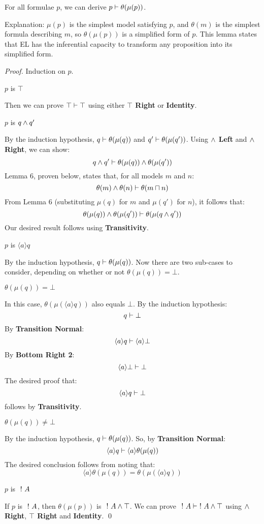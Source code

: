 \begin{lemma}
For all formulae $p$, we can derive $p \vdash \theta(\mu(p))$.
\end{lemma}
Explanation: $\mu(p)$ is the simplest model satisfying $p$, and $\theta(m)$ is the simplest formula describing $m$, so $\theta(\mu(p))$ is a simplified form of $p$. This lemma states that EL has the inferential capacity to transform any proposition into its simplified form.
\begin{proof}
Induction on $p$.

\setcounter{mycase}{0}

\begin{mycase}
$p$ is $\top$
\end{mycase}
Then we can prove  $\top \vdash \top$ using either {\bf $\top$ Right} or {\bf Identity}.

\begin{mycase}
$p$ is $q \land q'$
\end{mycase}
By the induction hypothesis, $q \vdash \theta(\mu(q))$ and $q' \vdash \theta(\mu(q'))$.
Using {\bf $\land$ Left} and {\bf $\land$ Right}, we can show:
\[
q \land q' \vdash \theta(\mu(q)) \land \theta(\mu(q'))
\]
Lemma 6, proven below, states that, for all models $m$ and $n$:
\[
\theta(m) \land \theta(n) \vdash \theta (m \sqcap n)
\]
From Lemma 6 (substituting $\mu(q)$ for $m$ and $\mu(q')$ for $n$), it follows that:
\[
\theta(\mu(q)) \land \theta(\mu(q')) \vdash \theta(\mu(q \land q'))
\]
Our desired result follows using {\bf Transitivity}.

\begin{mycase}
$p$ is $\langle a \rangle q$
\end{mycase}
By the induction hypothesis, $q \vdash \theta(\mu(q))$.
Now there are two sub-cases to consider, depending on whether or not $\theta(\mu(q)) = \bot$.
\begin{subcase}
$\theta(\mu(q)) = \bot$
\end{subcase}
In this case, $\theta(\mu(\langle a \rangle q))$ also equals $\bot$. 
By the induction hypothesis:
\[
q \vdash \bot
\]
By {\bf Transition Normal}:
\[
\langle a \rangle q \vdash \langle a \rangle \bot
\]
By {\bf Bottom Right 2}:
\[
\langle a \rangle \bot \vdash \bot
\]
The desired proof that:
\[
\langle a \rangle q \vdash \bot
\]
follows by {\bf Transitivity}.
\begin{subcase}
$\theta(\mu(q)) \neq \bot$
\end{subcase}
By the induction hypothesis, $q \vdash \theta(\mu(q))$.
So, by {\bf Transition Normal}:
\[
\langle a \rangle q \vdash \langle a \rangle \theta(\mu(q))
\]
The desired conclusion follows from noting that:
\[
 \langle a \rangle \theta(\mu(q)) = \theta(\mu(\langle a \rangle q))
 \]
 \begin{mycase}
$p$ is $\ ! \  A$
\end{mycase}
If $p$ is $\ ! \  A$, then $ \theta(\mu(p))$ is $\ ! \  A \land \top$.
We can prove $\ ! \  A \vdash \ ! \  A \land \top$ using {\bf $\land$ Right}, {\bf $\top$ Right} and {\bf Identity}.
\qed
\end{proof}

